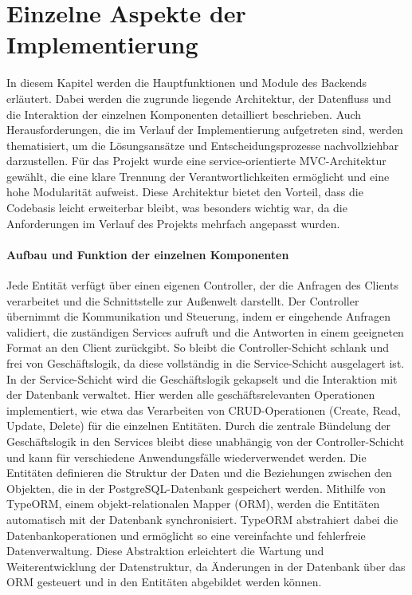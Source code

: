 \chapter{Einzelne Aspekte der Implementierung}
In diesem Kapitel werden die Hauptfunktionen und Module des Backends erläutert. Dabei werden die zugrunde liegende Architektur, der Datenfluss und die Interaktion der einzelnen Komponenten detailliert beschrieben. Auch Herausforderungen, die im Verlauf der Implementierung aufgetreten sind, werden thematisiert, um die Lösungsansätze und Entscheidungsprozesse nachvollziehbar darzustellen.
\newline
\newline
Für das Projekt wurde eine service-orientierte \ac{MVC}-Architektur gewählt, die eine klare Trennung der Verantwortlichkeiten ermöglicht und eine hohe Modularität aufweist. Diese Architektur bietet den Vorteil, dass die Codebasis leicht erweiterbar bleibt, was besonders wichtig war, da die Anforderungen im Verlauf des Projekts mehrfach angepasst wurden.
\subsubsection*{Aufbau und Funktion der einzelnen Komponenten}
Jede Entität verfügt über einen eigenen Controller, der die Anfragen des Clients verarbeitet und die Schnittstelle zur Außenwelt darstellt. Der Controller übernimmt die Kommunikation und Steuerung, indem er eingehende Anfragen validiert, die zuständigen Services aufruft und die Antworten in einem geeigneten Format an den Client zurückgibt. So bleibt die Controller-Schicht schlank und frei von Geschäftslogik, da diese vollständig in die Service-Schicht ausgelagert ist.
\newline
In der Service-Schicht wird die Geschäftslogik gekapselt und die Interaktion mit der Datenbank verwaltet. Hier werden alle geschäftsrelevanten Operationen implementiert, wie etwa das Verarbeiten von CRUD-Operationen (Create, Read, Update, Delete) für die einzelnen Entitäten. Durch die zentrale Bündelung der Geschäftslogik in den Services bleibt diese unabhängig von der Controller-Schicht und kann für verschiedene Anwendungsfälle wiederverwendet werden.
\newline
Die Entitäten definieren die Struktur der Daten und die Beziehungen zwischen den Objekten, die in der PostgreSQL-Datenbank gespeichert werden. Mithilfe von TypeORM, einem objekt-relationalen Mapper (ORM), werden die Entitäten automatisch mit der Datenbank synchronisiert. TypeORM abstrahiert dabei die Datenbankoperationen und ermöglicht so eine vereinfachte und fehlerfreie Datenverwaltung. Diese Abstraktion erleichtert die Wartung und Weiterentwicklung der Datenstruktur, da Änderungen in der Datenbank über das ORM gesteuert und in den Entitäten abgebildet werden können.
